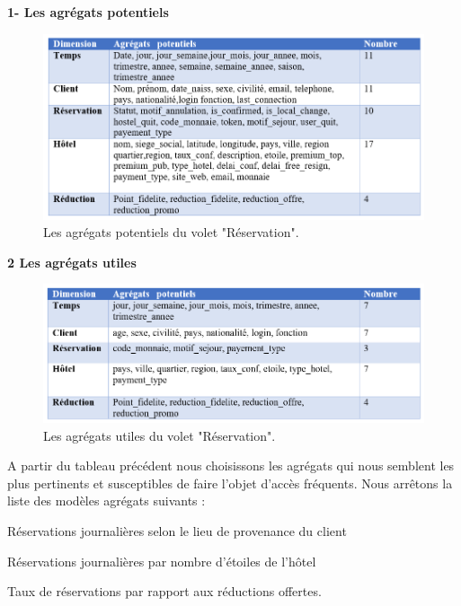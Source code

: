 \textbf{1- Les agrégats potentiels}

\begin{figure}[!htbp]
	\begin{center}
		\includegraphics[scale=0.65]{images/tab_agregat_pot_reservation.png}
		\caption{Les agrégats potentiels du volet "Réservation".}
		\label{use_bi_tools}
	\end{center}
	\end{figure}
\cleardoublepage
\textbf{2	Les agrégats utiles}
\begin{figure}[!htbp]
	\begin{center}
		\includegraphics[scale=0.65]{images/tab_agregat_uti_reservation.png}
		\caption{Les agrégats utiles du volet "Réservation".}
		\label{use_bi_tools}
	\end{center}
	\end{figure}

A partir du tableau précédent nous choisissons les agrégats qui nous semblent les plus pertinents et susceptibles de faire l’objet d’accès fréquents. Nous arrêtons la liste des modèles agrégats suivants :
\begin{list}{•}{ }
\item Réservations journalières selon le lieu de provenance du client
\item Réservations journalières par nombre d’étoiles de l’hôtel
\item Taux de réservations par rapport aux réductions offertes.
\end{list}

